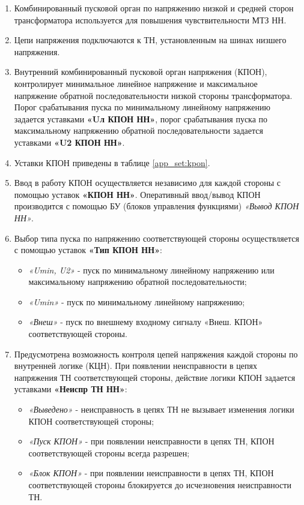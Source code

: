 \documentclass[a4paper, 12pt, table, hidelinks, DIV=calc]{extarticle}
\begin{document}
\begin{enumerate}[label=\arabic{section}.\arabic{subsection}.\arabic*,  align=left, labelsep=4pt, leftmargin=0pt, itemindent=57pt]

\item
Комбинированный пусковой орган по напряжению низкой и средней сторон трансформатора используется для повышения чувствительности МТЗ НН.   

\item
Цепи напряжения подключаются к ТН, установленным на шинах низшего напряжения.

\item
Внутренний комбинированный пусковой орган напряжения (КПОН), контролирует минимальное линейное напряжение и максимальное напряжение обратной последовательности низкой стороны трансформатора. Порог срабатывания пуска по минимальному линейному напряжению задается уставками \textbf{«Uл КПОН НН»}, порог срабатывания пуска по максимальному напряжению обратной последовательности задается уставками \textbf{«U2 КПОН НН»}. 

\item
Уставки КПОН приведены в таблице \ref{app_set:kpon}.

\item
Ввод в работу КПОН осуществляется независимо для каждой стороны с помощью уставок \textbf{«КПОН НН»}. Оперативный ввод/вывод КПОН производится с помощью БУ (блоков управления функциями)
\textit{«Вывод КПОН НН»}.

\item
Выбор типа пуска по напряжению соответствующей стороны осуществляется с помощью уставок \textbf{«Тип КПОН НН»}: 
\begin{itemize}
\item \textit{«Umin, U2»} - пуск по минимальному линейному напряжению или максимальному напряжению обратной последовательности;
\item \textit{«Umin»} - пуск по минимальному линейному напряжению;
\item \textit{«Внеш»} - пуск по внешнему входному сигналу «Внеш. КПОН» соответствующей стороны.
\end{itemize}

\item
Предусмотрена возможность контроля цепей напряжения каждой стороны по внутренней логике (КЦН). При появлении неисправности в цепях напряжения ТН соответствующей стороны, действие логики КПОН задается уставками \textbf{«Неиспр ТН НН»}:
\begin{itemize}
\item \textit{«Выведено»} - неисправность в цепях ТН не вызывает изменения логики КПОН соответствующей стороны;
\item \textit{«Пуск КПОН»} - при появлении неисправности в цепях ТН, КПОН соответствующей стороны всегда разрешен;
\item \textit{«Блок КПОН»} - при появлении неисправности в цепях ТН, КПОН соответствующей стороны блокируется до исчезновения неисправности ТН.
\end{itemize}


\end{enumerate}
\end{document}
